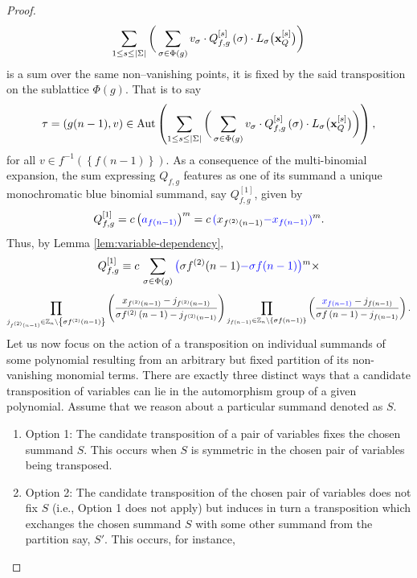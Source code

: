 \begin{proof}
\[
 \sum_{1\leq s\leq\left|\Sigma\right|}\bigg(\sum_{\sigma\in\Phi(g)}v_{\sigma}\cdot Q_{f,g}^{\left[s\right]}\left(\sigma\right)\cdot L_{\sigma}\big({\bf x}_{Q}^{\left[s\right]}\big)\bigg)
\]
is a sum over the same non--vanishing points, it is fixed by the said transposition on the sublattice $\Phi(g)$. That is to say
\[
\tau=\left(g(n-1),v\right)\in\text{Aut}\left(\sum_{1\leq s\leq\left|\Sigma\right|}\bigg(\sum_{\sigma\in\Phi(g)}v_{\sigma}\cdot Q_{f,g}^{\left[s\right]}\left(\sigma\right)\cdot L_{\sigma}\big({\bf x}_{Q}^{\left[s\right]}\big)\bigg)\right),
\]
for all $v\in f^{-1}\left(\left\{ f\left(n-1\right)\right\} \right).$
As a consequence of the multi-binomial expansion, the sum expressing
$Q_{f,g}$ features as one of its summand a unique monochromatic blue binomial summand, say $Q_{f,g}^{\left[1\right]}$, given by
\[
Q_{f,g}^{\left[1\right]}=c\left({\color{blue}a_{f\left(n-1\right)}}\right)^{m}=c\,{\color{blue}(}x_{f^{\left(2\right)}\left(n-1\right)}{\color{blue}-x_{f\left(n-1\right)})}^{m}.
\] 
Thus, by Lemma \ref{lem:variable-dependency},
\[
Q_{f,g}^{\left[1\right]}\equiv c\,\sum_{\sigma\in\Phi(g)}{\color{blue}\big(}\sigma f^{(2)}(n-1){\color{blue}-\sigma f(n-1)\big)}^{m}\times
\]
\[
\prod_{j_{f^{(2)}\left(n-1\right)}\in\mathbb{Z}_{n}\backslash\left\{ \sigma f^{(2)}\left(n-1\right)\right\} }\left(\frac{x_{f^{(2)}\left(n-1\right)}-j_{f^{(2)}\left(n-1\right)}}{\sigma f^{(2)}\left(n-1\right)-j_{f^{(2)}\left(n-1\right)}}\right)\prod_{j_{f\left(n-1\right)}\in\mathbb{Z}_{n}\backslash\left\{ \sigma f\left(n-1\right)\right\} }\left(\frac{{\color{blue}x_{f\left(n-1\right)}}-j_{f\left(n-1\right)}}{\sigma f\left(n-1\right)-j_{f\left(n-1\right)}}\right).
\]
Let us now focus on the action of a transposition
on individual summands of some polynomial resulting from an arbitrary but fixed partition
of its non-vanishing monomial terms. There are exactly three distinct ways that a candidate
transposition of variables can lie in the automorphism group of a
given polynomial.  Assume that we reason about
a particular summand denoted as $S$.
\begin{enumerate}
\item Option 1: The candidate transposition of a pair of variables fixes
the chosen summand $S$. This occurs when $S$ is symmetric in the
chosen pair of variables being transposed.
\item Option 2: The candidate transposition of the chosen pair of variables
does not fix $S$ (i.e., Option 1 does not apply) but induces in turn
a transposition which exchanges the chosen summand $S$ with some
other summand from the partition say, $S'$. This occurs, for instance,

\end{enumerate}
\end{proof}
